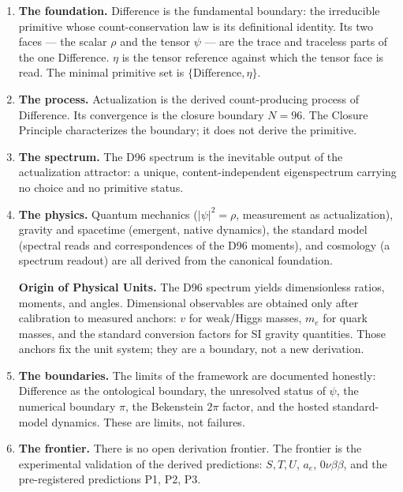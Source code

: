 \begin{enumerate}
\item \textbf{The foundation.} Difference is the fundamental boundary: the irreducible
primitive whose count-conservation law is its definitional identity. Its two faces --- the
scalar $\rho$ and the tensor $\psi$ --- are the trace and traceless parts of the one
Difference. $\eta$ is the tensor reference against which the tensor face is read. The
minimal primitive set is $\{\text{Difference},\eta\}$.

\item \textbf{The process.} Actualization is the derived count-producing process of
Difference. Its convergence is the closure boundary $N=96$. The Closure Principle
characterizes the boundary; it does not derive the primitive.

\item \textbf{The spectrum.} The D96 spectrum is the inevitable output of the actualization
attractor: a unique, content-independent eigenspectrum carrying no choice and no primitive
status.

\item \textbf{The physics.} Quantum mechanics ($|\psi|^2=\rho$, measurement as
actualization), gravity and spacetime (emergent, native dynamics), the standard model
(spectral reads and correspondences of the D96 moments), and cosmology (a spectrum readout)
are all derived from the canonical foundation.

\textbf{Origin of Physical Units.} The D96 spectrum yields dimensionless ratios, moments,
and angles. Dimensional observables are obtained only after calibration to measured
anchors: $v$ for weak/Higgs masses, $m_e$ for quark masses, and the standard conversion
factors for SI gravity quantities. Those anchors fix the unit system; they are a boundary,
not a new derivation.

\item \textbf{The boundaries.} The limits of the framework are documented honestly:
Difference as the ontological boundary, the unresolved status of $\psi$, the numerical
boundary $\pi$, the Bekenstein $2\pi$ factor, and the hosted standard-model dynamics.
These are limits, not failures.

\item \textbf{The frontier.} There is no open derivation frontier. The frontier is the
experimental validation of the derived predictions: $S,T,U$, $a_e$, $0\nu\beta\beta$, and
the pre-registered predictions P1, P2, P3.
\end{enumerate}

